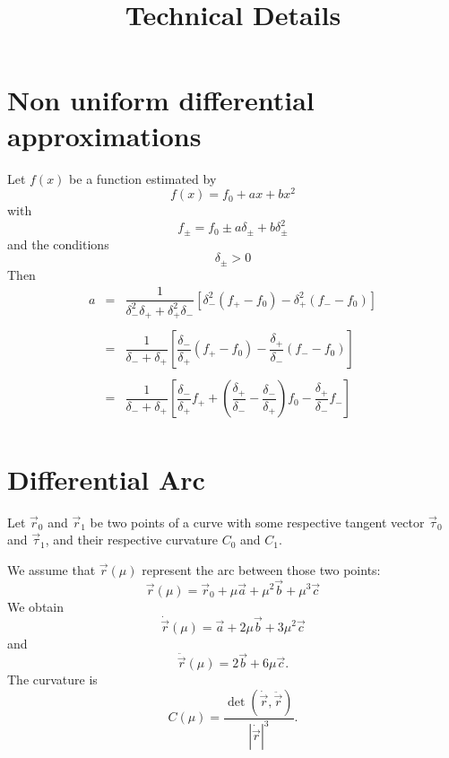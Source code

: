 \documentclass[11pt]{amsart}
\title{Technical Details}
\begin{document}
\maketitle

\section{Non uniform differential approximations}

Let $f(x)$ be a function estimated by
\[
	f(x) = f_0 + ax + b x^2
\]
with
\[
	f_\pm = f_0 \pm a \delta_\pm + b \delta_\pm^2
\]
and the conditions
\[
	\delta_\pm > 0 %
\]
Then
\[
\begin{array}{rcl}
	a & = &
	\dfrac{1}{\delta_-^2\delta_+ + \delta_+^2\delta_-}
	\left[ 
	   \delta_-^2\left(f_+ - f_0 \right)
	 - \delta_+^2\left(f_- - f_0 \right)
	\right] \\
	\\
	& = & \dfrac{1}{\delta_- + \delta_+} 
	\left[
	 \dfrac{\delta_-}{\delta_+} \left(f_+ - f_0 \right)
	-\dfrac{\delta_+}{\delta_-} \left(f_- - f_0 \right)
	\right] \\
	\\
	& = & \dfrac{1}{\delta_- + \delta_+} 
	\left[
	\dfrac{\delta_-}{\delta_+} f_+
	+\left(\dfrac{\delta_+}{\delta_-} - \dfrac{\delta_-}{\delta_+}\right) f_0
	-\dfrac{\delta_+}{\delta_-} f_-
	\right]\\
\end{array}
\]

\section{Differential Arc}
Let $\vec{r}_0$ and $\vec{r}_1$ be two points of a curve
with some respective tangent vector $\vec{\tau}_0$ and $\vec{\tau}_1$, and their
respective curvature $C_0$ and $C_1$.

We assume that $\vec{r}(\mu)$ represent the arc between those two points:
\[
	\vec{r}(\mu) = \vec{r}_0 + \mu \vec{a} + \mu^2 \vec{b} + \mu^3 \vec{c}
\]
We obtain
\[
	\dot{\vec{r}}(\mu) = \vec{a} + 2 \mu \vec{b} + 3 \mu^2 \vec{c}
\]
and
\[
	\ddot{\vec{r}}(\mu) = 2\vec{b} + 6 \mu \vec{c}.
\]
The curvature is
\[
	C(\mu) = \dfrac{\det\left(\dot{\vec{r}},\ddot{\vec{r}}\right)}{\left|\dot{\vec{r}}\right|^3}.
\]
\end{document}
